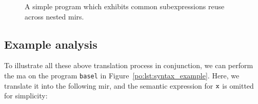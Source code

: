 \begin{figure}[ht]
{\label{po:fig:mir_fix_external_2}
    }
    \caption{%
        A simple program which exhibits common subexpressions reuse across
        nested \glspl{mir}.
    }
\end{figure}


\subsection{Example analysis}

To illustrate all these above translation process in conjunction,
we can perform the \gls{ma} on the program \verb|basel| in
Figure~\ref{po:lst:syntax_example}.  Here, we translate it into the following
\gls{mir}, and the semantic expression for $\texttt{x}$ is omitted for simplicity:
